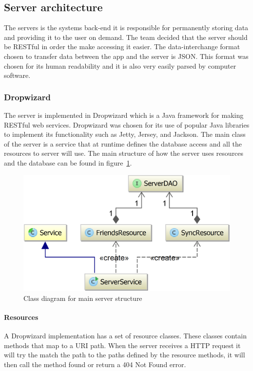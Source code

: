 \subsection{Server architecture}
The servers is the systems back-end it is responsible for permanently storing data and providing it to the user on demand. The team decided that the server should be RESTful in order the make accessing it easier. The data-interchange format chosen to transfer data between the app and the server is JSON. This format was chosen for its human readability and it is also very easily parsed by computer software.

\subsubsection{Dropwizard}
The server is implemented in Dropwizard which is a Java framework for making RESTful web services. Dropwizard was chosen for its use of popular Java libraries to implement its functionality such as Jetty, Jersey, and Jackson. The main class of the server is a service that at runtime defines the database access and all the resources to server will use. The main structure of how the server uses resources and the database can be found in figure~\ref{fig:classDiagramServer}.

\begin{figure}[H]
\includegraphics[width=\textwidth]{ch/architecture/fig/classDiagramServer.png}
\caption{Class diagram for main server structure}
\label{fig:classDiagramServer}
\end{figure}

\paragraph{Resources}
A Dropwizard implementation has a set of resource classes. These classes contain methods that map to a URI path. When the server receives a HTTP request it will try the match the path to the paths defined by the resource methods, it will then call the method found or return a 404 Not Found error.

